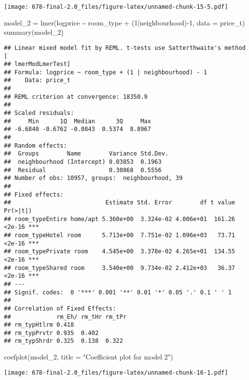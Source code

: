 \documentclass[
]{article}
\newenvironment{Shaded}{\begin{snugshade}}{\end{snugshade}}
\newcommand{\AttributeTok}[1]{\textcolor[rgb]{0.77,0.63,0.00}{#1}}
\newcommand{\DecValTok}[1]{\textcolor[rgb]{0.00,0.00,0.81}{#1}}
\newcommand{\FunctionTok}[1]{\textcolor[rgb]{0.00,0.00,0.00}{#1}}
\newcommand{\NormalTok}[1]{#1}
\newcommand{\OtherTok}[1]{\textcolor[rgb]{0.56,0.35,0.01}{#1}}
\newcommand{\SpecialCharTok}[1]{\textcolor[rgb]{0.00,0.00,0.00}{#1}}
\newcommand{\StringTok}[1]{\textcolor[rgb]{0.31,0.60,0.02}{#1}}
\begin{document}
\texttt{[image: 678-final-2.0\_files/figure-latex/unnamed-chunk-15-5.pdf]}

\begin{Shaded}
\begin{Highlighting}[]
\NormalTok{model\_2 }\OtherTok{=} \FunctionTok{lmer}\NormalTok{(logprice }\SpecialCharTok{\textasciitilde{}}\NormalTok{ room\_type }\SpecialCharTok{+}\NormalTok{ (}\DecValTok{1}\SpecialCharTok{|}\NormalTok{neighbourhood)}\SpecialCharTok{{-}}\DecValTok{1}\NormalTok{, }\AttributeTok{data =}\NormalTok{  price\_t)}
\FunctionTok{summary}\NormalTok{(model\_2)}
\end{Highlighting}
\end{Shaded}

\begin{verbatim}
## Linear mixed model fit by REML. t-tests use Satterthwaite's method [
## lmerModLmerTest]
## Formula: logprice ~ room_type + (1 | neighbourhood) - 1
##    Data: price_t
## 
## REML criterion at convergence: 18350.9
## 
## Scaled residuals: 
##     Min      1Q  Median      3Q     Max 
## -6.6840 -0.6762 -0.0843  0.5374  8.8967 
## 
## Random effects:
##  Groups        Name        Variance Std.Dev.
##  neighbourhood (Intercept) 0.03853  0.1963  
##  Residual                  0.30868  0.5556  
## Number of obs: 10957, groups:  neighbourhood, 39
## 
## Fixed effects:
##                           Estimate Std. Error        df t value Pr(>|t|)    
## room_typeEntire home/apt 5.360e+00  3.324e-02 4.006e+01  161.26   <2e-16 ***
## room_typeHotel room      5.713e+00  7.751e-02 1.096e+03   73.71   <2e-16 ***
## room_typePrivate room    4.545e+00  3.378e-02 4.265e+01  134.55   <2e-16 ***
## room_typeShared room     3.540e+00  9.734e-02 2.412e+03   36.37   <2e-16 ***
## ---
## Signif. codes:  0 '***' 0.001 '**' 0.01 '*' 0.05 '.' 0.1 ' ' 1
## 
## Correlation of Fixed Effects:
##             rm_Eh/ rm_tHr rm_tPr
## rm_typHtlrm 0.418               
## rm_typPrvtr 0.935  0.402        
## rm_typShrdr 0.325  0.138  0.322
\end{verbatim}

\begin{Shaded}
\begin{Highlighting}[]
\FunctionTok{coefplot}\NormalTok{(model\_2, }\AttributeTok{title =} \StringTok{"Coefficient plot for model 2"}\NormalTok{)}
\end{Highlighting}
\end{Shaded}

\texttt{[image: 678-final-2.0\_files/figure-latex/unnamed-chunk-16-1.pdf]}
\end{document}
